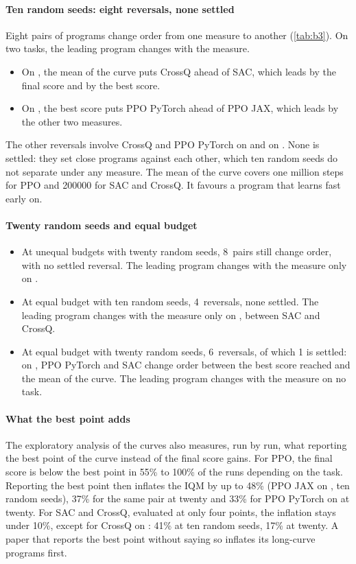 \paragraph{Ten random seeds: eight reversals, none settled}
Eight pairs of programs change order from one measure to another (\cref{tab:b3}). On two tasks, the leading
program changes with the measure.
\begin{itemize}
  \item On , the mean of the curve puts CrossQ ahead of SAC, which leads by the final score
    and by the best score.
  \item On , the best score puts PPO PyTorch ahead of PPO JAX, which leads by the other two
    measures.
\end{itemize}
The other reversals involve CrossQ and PPO PyTorch on  and on . None is settled:
they set close programs against each other, which ten random seeds do not separate under any measure. The
mean of the curve covers one million steps for PPO and \num{200000} for SAC and CrossQ. It favours a program
that learns fast early on.


\paragraph{Twenty random seeds and equal budget}
\begin{itemize}
  \item At unequal budgets with twenty random seeds, 8~pairs still change order, with no settled reversal. The
    leading program changes with the measure only on .
  \item At equal budget with ten random seeds, 4~reversals, none settled. The leading program changes with the
    measure only on , between SAC and CrossQ.
  \item At equal budget with twenty random seeds, 6~reversals, of which 1 is settled: on , PPO
    PyTorch and SAC change order between the best score reached and the mean of the curve. The leading
    program changes with the measure on no task.
\end{itemize}

\paragraph{What the best point adds}
The exploratory analysis of the curves also measures, run by run, what reporting the best point of the
curve instead of the final score gains. For PPO, the final score is below the best point in 55\% to 100\% of
the runs depending on the task. Reporting the best point then inflates the IQM by up to 48\% (PPO JAX on
, ten random seeds), 37\% for the same pair at twenty and 33\% for PPO PyTorch on
 at twenty. For SAC and CrossQ, evaluated at only four points, the inflation stays under 10\%,
except for CrossQ on : 41\% at ten random seeds, 17\% at twenty. A paper that reports the best
point without saying so inflates its long-curve programs first.

